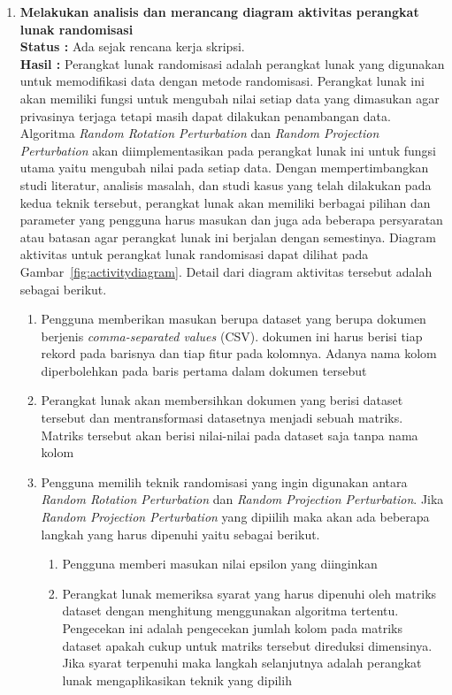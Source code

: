 \documentclass[a4paper,twoside]{article}
\begin{document}
\begin{enumerate}
		\item \textbf{Melakukan analisis dan merancang diagram aktivitas perangkat lunak randomisasi}\\
		{\bf Status :} Ada sejak rencana kerja skripsi.\\
		{\bf Hasil :} Perangkat lunak randomisasi adalah perangkat lunak yang digunakan untuk memodifikasi data dengan metode randomisasi. Perangkat lunak ini akan memiliki fungsi untuk mengubah nilai setiap data yang dimasukan agar privasinya terjaga tetapi masih dapat dilakukan penambangan data. Algoritma \textit{Random Rotation Perturbation} dan \textit{Random Projection Perturbation} akan diimplementasikan pada perangkat lunak ini untuk fungsi utama yaitu mengubah nilai pada setiap data. Dengan mempertimbangkan studi literatur, analisis masalah, dan studi kasus yang telah dilakukan pada kedua teknik tersebut, perangkat lunak akan memiliki berbagai pilihan dan parameter yang pengguna harus masukan dan juga ada beberapa persyaratan atau batasan agar perangkat lunak ini berjalan dengan semestinya. Diagram aktivitas untuk perangkat lunak randomisasi dapat dilihat pada Gambar~\ref{fig:activitydiagram}. Detail dari diagram aktivitas tersebut adalah sebagai berikut.
		\begin{enumerate}
			\item Pengguna memberikan masukan berupa dataset yang berupa dokumen berjenis \textit{comma-separated values} (CSV). dokumen ini harus berisi tiap rekord pada barisnya dan tiap fitur pada kolomnya. Adanya nama kolom diperbolehkan pada baris pertama dalam dokumen tersebut
			\item Perangkat lunak akan membersihkan dokumen yang berisi dataset tersebut dan mentransformasi datasetnya menjadi sebuah matriks. Matriks tersebut akan berisi nilai-nilai pada dataset saja tanpa nama kolom
			\item Pengguna memilih teknik randomisasi yang ingin digunakan antara \textit{Random Rotation Perturbation} dan \textit{Random Projection Perturbation}. Jika \textit{Random Projection Perturbation} yang dipiilih maka akan ada beberapa langkah yang harus dipenuhi yaitu sebagai berikut.
			\begin{enumerate}
				\item Pengguna memberi masukan nilai epsilon yang diinginkan
				\item Perangkat lunak memeriksa syarat yang harus dipenuhi oleh matriks dataset dengan menghitung menggunakan algoritma tertentu. Pengecekan ini adalah pengecekan jumlah kolom pada matriks dataset apakah cukup untuk matriks tersebut direduksi dimensinya. Jika syarat terpenuhi maka langkah selanjutnya adalah perangkat lunak mengaplikasikan teknik yang dipilih

\end{enumerate}
\end{enumerate}
\end{enumerate}
\end{document}
